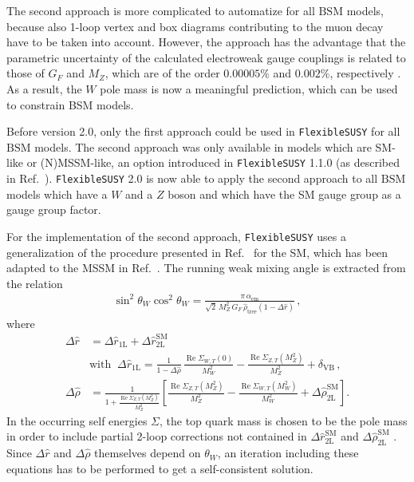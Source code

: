 \documentclass[final,3p,11pt,pdflatex]{elsarticle}
\makeatletter
\newcommand{\fs}{\texttt{FlexibleSUSY}\@\xspace}
\newcommand{\fstwo}{\fs 2.0\@\xspace}
\newcommand{\SM}{\ensuremath{\text{SM}}\xspace}
\newcommand{\BSM}{\ensuremath{\text{BSM}}\xspace}
\newcommand{\deltaVB}{\ensuremath{\delta_{\text{VB}}}\xspace}
\DeclareMathOperator{\re}{Re}
\def\aem{\alpha_{\text{em}}}
\makeatother
\begin{document}
The second approach is more complicated to automatize for all \BSM
models, because also 1-loop vertex and box diagrams contributing to
the muon decay have to be taken into account.  However, the approach
has the advantage that the parametric uncertainty of the calculated
electroweak gauge couplings is related to those
of $G_F$ and $M_Z$, which are of the order $0.00005\%$
and $0.002\%$, respectively \cite{Olive:2016xmw}. As a result, the $W$
pole mass is now a meaningful prediction, which can be used to
constrain BSM models.

Before version 2.0, only the first approach could be used in \fs for
all \BSM models.  The second approach was only available in models
which are SM-like or (N)MSSM-like, an option introduced in \fs 1.1.0 (as described in Ref.\ \cite{Staub:2015aea}).
\fstwo is now able to apply the second approach to all \BSM models
which have a $W$ and a $Z$ boson and which have the SM gauge
group as a gauge group factor.

For the implementation of the second approach, \fs uses a
generalization of the procedure presented in Ref.~\cite{Degrassi:1990tu}
for the SM, which has been adapted to the MSSM in Ref.~\cite{Pierce:1996zz}.
The running weak mixing angle is extracted from the relation
\cite{Degrassi:1990tu}
%
\begin{align}
  \sin^2\theta_W \cos^2\theta_W =
  \frac{\pi\,\aem}
   {\sqrt{2}\,M_Z^2\,G_F\,\hat\rho_\text{tree} \left(1-\Delta\hat{r}\right)}\,,
  \label{eq:muon_decay_master}
\end{align}
%
where
%
\begin{align}
  \Delta\hat{r} &= \Delta\hat{r}_\text{1L} + \Delta\hat{r}_\text{2L}^\SM \\
  &\text{with}\;\;
  \Delta\hat{r}_\text{1L} = \frac{1}{1-\Delta\hat\rho}\,\frac{\re\Sigma_{W,T}(0)}{M_W^2}
  - \frac{\re\Sigma_{Z,T}(M_Z^2)}{M_Z^2} + \deltaVB\,,
  \label{eq:Delta_r_hat}\\
  \Delta\hat\rho &= \frac{1}{1 + \frac{\re\Sigma_{Z,T}(M_Z^2)}{M_Z^2}}
  \left[\frac{\re\Sigma_{Z,T}(M_Z^2)}{M_Z^2} - \frac{\re\Sigma_{W,T}(M_W^2)}{M_W^2}
   + \Delta\hat\rho_\text{2L}^\SM\right].
   \label{eq:Delta_rho_hat}
\end{align}
%
In the occurring self energies $\Sigma$, the top quark mass is chosen
to be the pole mass in order to include partial 2-loop corrections not
contained in $\Delta\hat{r}_\text{2L}^\SM$ and $\Delta\hat\rho_\text{2L}^\SM$
\cite{Fanchiotti:1992tu}.
Since $\Delta\hat{r}$ and $\Delta\hat\rho$ themselves depend
on $\theta_W$, an iteration including these equations has to be
performed to get a self-consistent solution.
\end{document}
